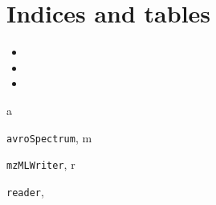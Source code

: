 \documentclass[letterpaper,10pt,english]{sphinxmanual}
\begin{document}
\begin{fulllineitems}
\begin{fulllineitems}
\begin{description}
\end{description}

\end{fulllineitems}


\end{fulllineitems}



\chapter{Indices and tables}
\label{index:indices-and-tables}\begin{itemize}
\item {} 

\item {} 

\item {} 

\end{itemize}


\renewcommand{\indexname}{Python Module Index}
\begin{theindex}
\def\bigletter#1{{\Large\sffamily#1}\nopagebreak\vspace{1mm}}
\bigletter{a}
\item {\texttt{avroSpectrum}}, \pageref{avroSpectrum:module-avroSpectrum}
\indexspace
\bigletter{m}
\item {\texttt{mzMLWriter}}, \pageref{mzMLWriter:module-mzMLWriter}
\indexspace
\bigletter{r}
\item {\texttt{reader}}, \pageref{reader:module-reader}
\end{theindex}

\renewcommand{\indexname}{Index}
\printindex
\end{document}
